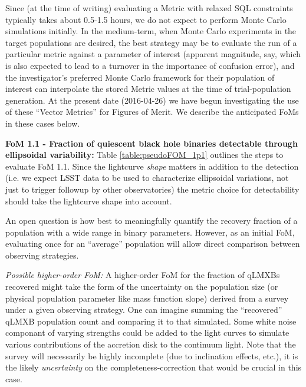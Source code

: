 Since (at the time of writing) evaluating a Metric with relaxed
  SQL constraints typically takes about 0.5-1.5 hours, we do not
  expect to perform Monte Carlo simulations initially. In the
  medium-term, when Monte Carlo experiments in the target populations
  are desired, the best strategy may be to evaluate the
  run of a particular metric against a parameter of interest (apparent
  magnitude, say, which is also expected to lead to a turnover in the
  importance of confusion error), and the investigator's preferred
  Monte Carlo framework for their population of interest can
  interpolate the stored Metric values at the time of trial-population
  generation. At the present date (2016-04-26) we have begun
  investigating the use of these ``Vector Metrics'' for Figures of
  Merit. We describe the anticipated FoMs in these cases below.

{\bf FoM 1.1 - Fraction of quiescent black hole binaries detectable
  through ellipsoidal variability:} Table
  \ref{table:pseudoFOM_1p1} outlines the steps to evaluate FoM
  1.1. Since the lightcurve {\it shape} matters in addition to the
  detection (i.e. we expect LSST data to be used to characterize
  ellipsoidal variations, not just to trigger followup by other
  observatories) the metric choice for detectability should take the
  lightcurve shape into account.


An open question is how best to meaningfully quantify the
  recovery fraction of a population with a wide range in binary
  parameters. However, as an initial FoM, evaluating once for an
  ``average'' population will allow direct comparison between
  observing strategies.

{\it Possible higher-order FoM:} A higher-order FoM for the fraction
of qLMXBs recovered might take the form of the uncertainty on the
population size (or physical population parameter like mass function
slope) derived from a survey under a given observing strategy. One can
imagine summing the ``recovered'' qLMXB population count and comparing
it to that simulated. Some white noise componant of varying strengths
could be added to the light curves to simulate various contributions
of the accretion disk to the continuum light.  Note that the survey
will necessarily be highly incomplete (due to inclination effects,
etc.), it is the likely {\it uncertainty} on the
completeness-correction that would be crucial in this case.


